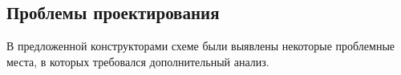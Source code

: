 \subsection{Проблемы проектирования}

В предложенной конструкторами схеме были выявлены некоторые проблемные места, в которых требовался дополнительный анализ. 



